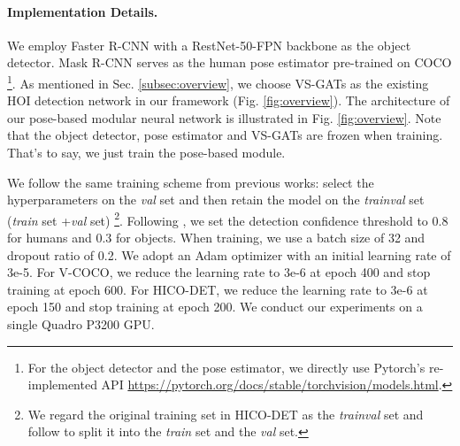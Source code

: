 \documentclass[10pt,twocolumn,letterpaper]{article}
\begin{document}
\paragraph{\textbf{Implementation Details.}}\label{subsec:impldetails}  
We employ Faster R-CNN \cite{renNIPS15fasterrcnn} with a RestNet-50-FPN backbone \cite{he2016deep,lin2017feature} as the object detector. Mask R-CNN \cite{he2017mask} serves as the human pose estimator pre-trained on COCO \cite{Lin2014MicrosoftContext} \footnote{For the object detector and the pose estimator, we directly use Pytorch's  re-implemented API \url{https://pytorch.org/docs/stable/torchvision/models.html}.}. As mentioned in Sec. \ref{subsec:overview}, we choose VS-GATs \cite{liang2020visualsemantic} as the existing HOI detection network in our framework (Fig. \ref{fig:overview}). The architecture of our pose-based modular neural network is illustrated in Fig. \ref{fig:overview}. Note that the object detector, pose estimator and VS-GATs are frozen when training. That's to say, we just train the pose-based module.

We follow the same training scheme from previous works: select the hyperparameters on the \textit{val} set and then retain the model on the \textit{trainval} set (\textit{train} set +\textit{val} set) \footnote{We regard the original training set in HICO-DET as the \textit{trainval} set and follow \cite{liang2020visualsemantic} to split it into the \textit{train} set and the \textit{val} set.}. Following \cite{liang2020visualsemantic}, we set the detection confidence threshold to 0.8 for humans and 0.3 for objects. When training, we use a batch size of 32 and dropout ratio of 0.2. We adopt an Adam optimizer with an initial learning rate of 3e-5. For V-COCO, we reduce the learning rate to 3e-6 at epoch 400 and stop training at epoch 600. For HICO-DET, we reduce the learning rate to 3e-6 at epoch 150 and stop training at epoch 200. We conduct our experiments on a single Quadro P3200 GPU.
\end{document}
